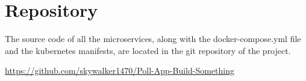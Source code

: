 \section{Repository}

The source code of all the microservices, along with the docker-compose.yml file and the kubernetes manifests, are located in the git repository of the project.

\begin{center}
    \url{https://github.com/skywalker1470/Poll-App-Build-Something}
\end{center}
